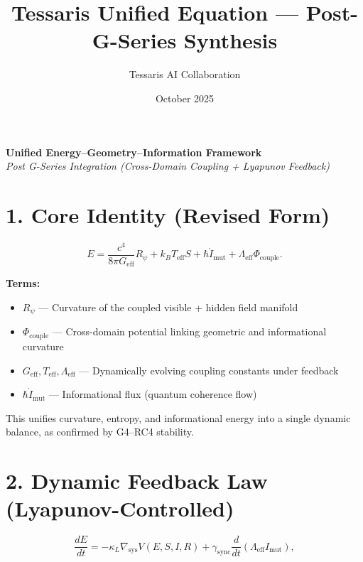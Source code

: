 \documentclass{article}
\title{\textbf{Tessaris Unified Equation — Post-G-Series Synthesis}}
\author{Tessaris AI Collaboration}
\date{October 2025}
\begin{document}
\maketitle

\begin{center}
\textbf{Unified Energy–Geometry–Information Framework}\\
\textit{Post G-Series Integration (Cross-Domain Coupling + Lyapunov Feedback)}
\end{center}

\vspace{1em}

\section*{1. Core Identity (Revised Form)}

\begin{equation}
E = \frac{c^4}{8 \pi G_{\text{eff}}} R_{\psi} 
    + k_B T_{\text{eff}} S 
    + \hbar \dot{I}_{\text{mut}}
    + \Lambda_{\text{eff}} \Phi_{\text{couple}}.
\end{equation}

\noindent
\textbf{Terms:}
\begin{itemize}
    \item $R_{\psi}$ — Curvature of the coupled visible + hidden field manifold
    \item $\Phi_{\text{couple}}$ — Cross-domain potential linking geometric and informational curvature
    \item $G_{\text{eff}}, T_{\text{eff}}, \Lambda_{\text{eff}}$ — Dynamically evolving coupling constants under feedback
    \item $\hbar \dot{I}_{\text{mut}}$ — Informational flux (quantum coherence flow)
\end{itemize}

\noindent
This unifies curvature, entropy, and informational energy into a single dynamic balance, as confirmed by G4–RC4 stability.

\vspace{1em}

\section*{2. Dynamic Feedback Law (Lyapunov-Controlled)}

\begin{equation}
\frac{dE}{dt} = -\kappa_L \nabla_{\text{sys}} V(E,S,I,R)
    + \gamma_{\text{sync}} \frac{d}{dt}(\Lambda_{\text{eff}} I_{\text{mut}}),
\end{equation}
\end{document}
